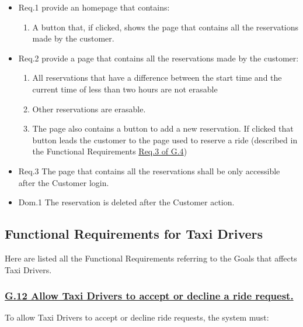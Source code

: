 				\begin{itemize}
					\item \lbrack Req.1\rbrack \label{sec:fr1_g11} provide an homepage that contains:
						\begin{enumerate}
							\item A button that, if clicked, shows the page that contains all the reservations made by the customer.
						\end{enumerate}
					\item \lbrack Req.2\rbrack \label{sec:fr2_g11} provide a page that contains all the reservations made by the customer:
						\begin{enumerate}
							\item All reservations that have a difference between the start time and the current time of less than two hours are not erasable
							\item Other reservations are erasable.
							\item The page also contains a button to add a new reservation. If clicked that button leads the customer to the page used to reserve a ride (described in the Functional Requirements \hyperref[sec:fr3_g4]{Req.3 of G.4})
						\end{enumerate}
					\item \lbrack Req.3\rbrack \label{sec:fr3_g11} The page that contains all the reservations shall be only accessible after the Customer login.
					\item \lbrack Dom.1\rbrack \label{sec:da1_g11} The reservation is deleted after the Customer action.
				\end{itemize}

		\subsection{Functional Requirements for Taxi Drivers}
		Here are listed all the Functional Requirements referring to the Goals that affects Taxi Drivers.

			\subsubsection{\lbrack \hyperref[sec:g12]{G.12 Allow Taxi Drivers to accept or decline a ride request.}\rbrack}\label{sec:frs12}
			To allow Taxi Drivers to accept or decline ride requests, the system must:


